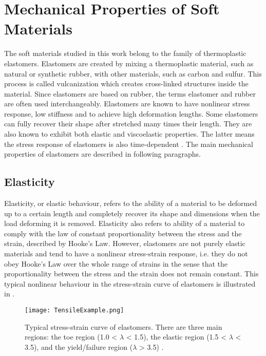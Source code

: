 \section{Mechanical Properties of Soft Materials} \label{sec:mechprop}

The soft materials studied in this work belong to the family of thermoplastic elastomers. Elastomers are created by mixing a thermoplastic material, such as natural or synthetic rubber, with other materials, such as carbon and sulfur. This process is called vulcanization which creates cross-linked structures inside the material. Since elastomers are based on rubber, the terms elastomer and rubber are often used interchangeably. Elastomers are known to have nonlinear stress response, low stiffness and to achieve high deformation lengths. Some elastomers can fully recover their shape after stretched many times their length. They are also known to exhibit both elastic and viscoelastic properties. The latter means the stress response of elastomers is also time-dependent \cite{Bauman2008}. The main mechanical properties of elastomers are described in following paragraphs.

\subsection{Elasticity}

Elasticity, or elastic behaviour, refers to the ability of a material to be deformed up to a certain length and completely recover its shape and dimensions when the load deforming it is removed. Elasticity also refers to ability of a material to comply with the law of constant proportionality between the stress and the strain, described by Hooke's Law. However, elastomers are not purely elastic materials and tend to have a nonlinear stress-strain response, i.e. they do not obey Hooke's Law over the whole range of strains in the sense that the proportionality between the stress and the strain does not remain constant. This typical nonlinear behaviour in the stress-strain curve of elastomers is illustrated in .

\begin{figure}[hbt!]
    \centering
    \texttt{[image: TensileExample.png]}
    \caption{Typical stress-strain curve of elastomers. There are three main regions: the toe region (1.0 < $\lambda$ < 1.5), the elastic region (1.5 < $\lambda$ < 3.5), and the yield/failure region ($\lambda$ > 3.5) \cite{Bauman2008}.}
    \label{fig:tensile}
\end{figure}

